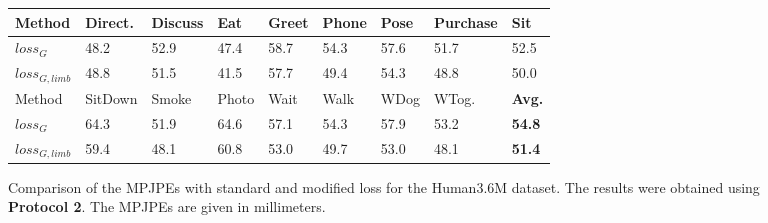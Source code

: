 \begin{figure}[bt]	
	\centering
	\begin{tabularx}{\textwidth}{l *{8}{Y}}
		\toprule
		Method & Direct. & Discuss & Eat & Greet & Phone & Pose & Purchase & Sit \\
		\midrule
		$loss_G$ & 48.2 & 52.9 & 47.4 & 58.7 & 54.3 & 57.6 & 51.7 & 52.5\\
		$loss_{G, limb}$ & 48.8 & 51.5 & 41.5 & 57.7 & 49.4 & 54.3 & 48.8 & 50.0 \\
		\bottomrule
		\toprule
		Method & SitDown & Smoke & Photo & Wait & Walk & WDog & WTog. & \textbf{Avg.}\\
		\midrule
		$loss_G$ & 64.3 & 51.9 & 64.6 & 57.1 & 54.3 & 57.9 & 53.2 & \textbf{54.8} \\
		$loss_{G, limb}$ & 59.4 & 48.1 & 60.8 & 53.0 & 49.7 & 53.0 & 48.1 & \textbf{51.4} \\
		\bottomrule
	\end{tabularx}
	\caption{
		Comparison of the MPJPEs with standard and modified loss for the Human3.6M dataset. 
		The results were obtained using \textbf{Protocol 2}. The MPJPEs are given in millimeters.
	 }
	\label{fig:results-limb-loss}
\end{figure}